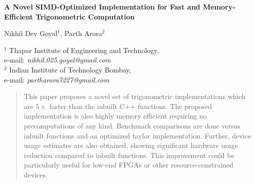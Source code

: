 \documentclass[12pt,twoside, letterpaper, margin=1in]{article}
\begin{document}
  \singlespacing
  \label{'ubf'}  
\setcounter{page}{1}                                 %


\markboth {\hspace*{-9mm} \centerline{\footnotesize \sc
     }
                 }
                { \centerline                           {\footnotesize \sc  
                                                    } \hspace*{-9mm}              
               }




\vspace*{-2cm}


\begin{center}
{ 
       {\Large\textbf{A Novel SIMD-Optimized Implementation for Fast and Memory-Efficient Trigonometric Computation}}
\\
\medskip

{\sc Nikhil Dev Goyal$^{1}$, Parth Arora$^{2}$} \\

\medskip

{\footnotesize
$^{1}$ Thapar Institute of Engineering and Technology,\\
e-mail: {\it nikhil.025.goyal@gmail.com} \\

$^{2}$ Indian Institute of Technology Bombay,\\
e-mail: {\it partharora7227@gmail.com}
}
}
\end{center}




\thispagestyle{empty}


\hrulefill


\begin{abstract}  
{\footnotesize This paper proposes a novel set of trigonometric implementations which are \(5 \times\) faster than the inbuilt C++ functions. The proposed implementation is also highly memory efficient requiring no precomputations of any kind. Benchmark comparisons are done versus inbuilt functions and an optimized taylor implementation. Further, device usage estimates are also obtained, showing significant hardware usage reduction compared to inbuilt functions. This improvement could be particularly useful for low-end FPGAs or other resource-constrained devices.
}
 \end{abstract}
 \hrulefill
\end{document}
